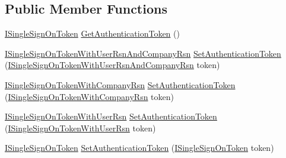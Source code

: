 \subsection*{Public Member Functions}
\begin{DoxyCompactItemize}
\item 
\hyperlink{interfaceCqrs_1_1Authentication_1_1ISingleSignOnToken}{I\+Single\+Sign\+On\+Token} \hyperlink{classCqrs_1_1Authentication_1_1WebSingleSignOnTokenValueHelper_a342055eafc9218e08d0e67bcccc912d5_a342055eafc9218e08d0e67bcccc912d5}{Get\+Authentication\+Token} ()
\item 
\hyperlink{interfaceCqrs_1_1Authentication_1_1ISingleSignOnTokenWithUserRsnAndCompanyRsn}{I\+Single\+Sign\+On\+Token\+With\+User\+Rsn\+And\+Company\+Rsn} \hyperlink{classCqrs_1_1Authentication_1_1WebSingleSignOnTokenValueHelper_af7ff2651f39af93b2b32a5a8646ce25a_af7ff2651f39af93b2b32a5a8646ce25a}{Set\+Authentication\+Token} (\hyperlink{interfaceCqrs_1_1Authentication_1_1ISingleSignOnTokenWithUserRsnAndCompanyRsn}{I\+Single\+Sign\+On\+Token\+With\+User\+Rsn\+And\+Company\+Rsn} token)
\item 
\hyperlink{interfaceCqrs_1_1Authentication_1_1ISingleSignOnTokenWithCompanyRsn}{I\+Single\+Sign\+On\+Token\+With\+Company\+Rsn} \hyperlink{classCqrs_1_1Authentication_1_1WebSingleSignOnTokenValueHelper_a90608051ba881a8b7166db2f12d54b57_a90608051ba881a8b7166db2f12d54b57}{Set\+Authentication\+Token} (\hyperlink{interfaceCqrs_1_1Authentication_1_1ISingleSignOnTokenWithCompanyRsn}{I\+Single\+Sign\+On\+Token\+With\+Company\+Rsn} token)
\item 
\hyperlink{interfaceCqrs_1_1Authentication_1_1ISingleSignOnTokenWithUserRsn}{I\+Single\+Sign\+On\+Token\+With\+User\+Rsn} \hyperlink{classCqrs_1_1Authentication_1_1WebSingleSignOnTokenValueHelper_a4e87135209dbc5325decf308e85408ed_a4e87135209dbc5325decf308e85408ed}{Set\+Authentication\+Token} (\hyperlink{interfaceCqrs_1_1Authentication_1_1ISingleSignOnTokenWithUserRsn}{I\+Single\+Sign\+On\+Token\+With\+User\+Rsn} token)
\item 
\hyperlink{interfaceCqrs_1_1Authentication_1_1ISingleSignOnToken}{I\+Single\+Sign\+On\+Token} \hyperlink{classCqrs_1_1Authentication_1_1WebSingleSignOnTokenValueHelper_a610771aef2e0c8e0513e76577da2a4c8_a610771aef2e0c8e0513e76577da2a4c8}{Set\+Authentication\+Token} (\hyperlink{interfaceCqrs_1_1Authentication_1_1ISingleSignOnToken}{I\+Single\+Sign\+On\+Token} token)
\end{DoxyCompactItemize}


